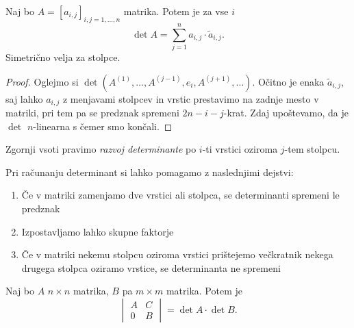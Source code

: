 \documentclass[12pt, a4paper]{article}
\begin{document}
\begin{izrek}
Naj bo $A=\left[a_{i,j}\right]_{i,j=1,\dots,n}$ matrika. Potem je za vse $i$
\[
\det A=\sum_{j=1}^n a_{i,j}\cdot\widetilde{a}_{i,j}.
\]
Simetrično velja za stolpce.
\end{izrek}

\begin{proof}
Oglejmo si $\det(A^{(1)},\dots,A^{(j-1)},e_i,A^{(j+1)},\dots)$. Očitno je enaka $\widetilde{a}_{i,j}$, saj lahko $a_{i,j}$ z menjavami stolpcev in vrstic prestavimo na zadnje mesto v matriki, pri tem pa se predznak spremeni $2n-i-j$-krat. Zdaj upoštevamo, da je $\det$ $n$-linearna s čemer smo končali. 
\end{proof}

\begin{opomba}
Zgornji vsoti pravimo \emph{razvoj determinante} po $i$-ti vrstici oziroma $j$-tem stolpcu.
\end{opomba}

\begin{okvir}
\begin{posledica}
Pri računanju determinant si lahko pomagamo z naslednjimi dejstvi:

\begin{enumerate}[label=\arabic*)]
\item Če v matriki zamenjamo dve vrstici ali stolpca, se determinanti spremeni le predznak
\item Izpostavljamo lahko skupne faktorje
\item Če v matriki nekemu stolpcu oziroma vrstici prištejemo večkratnik nekega drugega stolpca oziramo vrstice, se determinanta ne spremeni
\end{enumerate}
\end{posledica}
\end{okvir}

\begin{trditev}
Naj bo $A$ $n\times n$ matrika, $B$ pa $m\times m$ matrika. Potem je
\[
\begin{vmatrix}
A & C \\
0 & B
\end{vmatrix} = \det A\cdot\det B.
\]
\end{trditev}

\obvs
\end{document}

